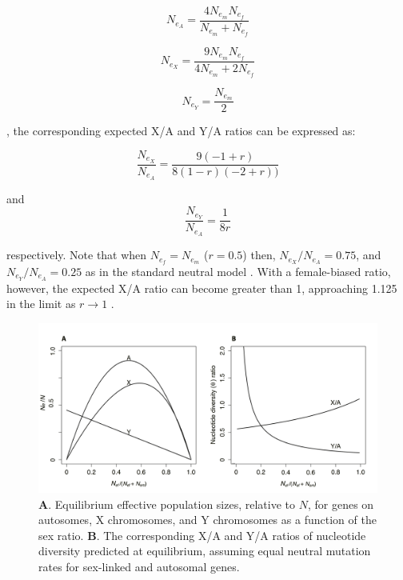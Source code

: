 \documentclass[9pt,twocolumn,twoside,lineno]{gsajnl}
\begin{document}
\begin{equation}
N_{e_{A}} = \frac{4N_{e_{m}}N_{e_{f}}}{N_{e_{m}}+N_{e_{f}}} \label{eq:NeA}
\end{equation}

\begin{equation}
N_{e_{X}} = \frac{9N_{e_{m}}N_{e_{f}}}{4N_{e_{m}}+2N_{e_{f}}} \label{eq:NeX}
\end{equation}

\begin{equation}
N_{e_{Y}} = \frac{N_{e_{m}}}{2} \label{eq:NeY}
\end{equation}

\citep{wright1931evolution}, the corresponding expected X/A and Y/A ratios can be expressed as:

\begin{equation}
\frac{N_{e_{X}}}{N_{e_{A}}} = \frac{9 (-1 + r)}{8 (1 - r) (-2 + r))} \label{eq:XA}
\end{equation}

and
\begin{equation}
\frac{N_{e_{Y}}}{N_{e_{A}}} = \frac{1}{8r} \label{eq:YA}
\end{equation}

respectively.  Note that when $N_{e_{f}} = N_{e_{m}}$ ($r=0.5$) then, $N_{e_{X}}/N_{e_{A}} = 0.75$, and $N_{e_{Y}}/N_{e_{A}} = 0.25$ as in the standard neutral model \citep{wright1931evolution}. With a female-biased ratio, however, the expected X/A ratio can become greater than 1, approaching 1.125 in the limit as $r\rightarrow 1$ \citep{caballero1995}.

\begin{figure}[htbp]
\centering
\noindent
\includegraphics[width=\linewidth]{figure1.jpg}
\caption{\textbf{A}. Equilibrium effective population sizes, relative to $N$, for genes on autosomes, X chromosomes, and Y chromosomes as a function of the sex ratio. \textbf{B}. The corresponding X/A and Y/A ratios of nucleotide diversity predicted at equilibrium, assuming equal neutral mutation rates for sex-linked and autosomal genes.
}
\end{figure}
\end{document}
